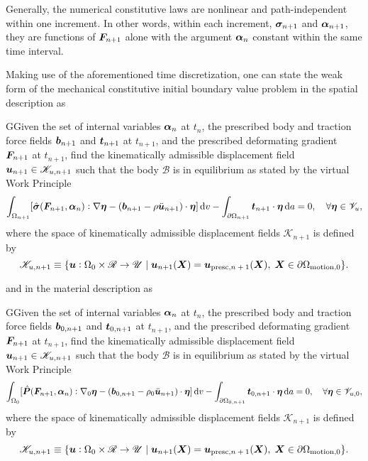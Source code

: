 Generally, the numerical constitutive laws are nonlinear and path-independent within one increment.
In other words, within each increment, $\bm{\sigma}_{n+1}$ and $\bm{\alpha}_{n+1}$, they are functions of $\bm{F}_{n+1}$ alone with the argument $\bm{\alpha}_n$ constant within the same time interval.

Making use of the aforementioned time discretization, one can state the weak form of the mechanical constitutive initial boundary value problem in the spatial description as
\begin{problem}
    GGiven the set of internal variables $\bm{\alpha}_n$ at $t_n$, the prescribed body and traction force fields $\bm{b}_{n+1}$ and $\bm{t}_{n+1}$ at $t_{n+1}$, and the prescribed deformating gradient $\bm{F}_{n+1}$ at $t_{n+1}$, find the kinematically admissible displacement field $\bm{u}_{n+1}\in\mathscr{K}_{u,n+1}$ such that the body $\mathscr{B}$ is in equilibrium as stated by the virtual Work Principle
            \begin{equation}
        \int_{\Omega_{n+1}} [\hat{\bm{\sigma}}(\bm{F}_{n+1}, \bm{\alpha}_n):\nabla \bm{\eta} - (\bm{b}_{n+1}-\rho\ddot{\bm u}_{n+1})\cdot \bm{\eta}]\,\mathrm{d} v - \int_{\partial\Omega_{n+1}} \bm{t}_{n+1}\cdot \bm{\eta}\,\mathrm{d} a = 0,\quad \forall \bm{\eta} \in \mathscr{V}_u,
    \end{equation}
    where the space of kinematically admissible displacement fields $\mathscr{K}_{n+1}$ is defined by
    \begin{equation}
            \mathscr{K}_{u,n+1}\equiv \{\bm{u}:\Omega_0\times \mathscr{R}\to \mathscr{U}\;|\;\bm{u}_{n+1}(\bm{X}) = \bm{u}_\text{presc,$n+1$}(\bm{X}),\;\bm{X}\in\partial \Omega_\text{motion,0}\}.
    \end{equation}
\end{problem}
and in the material description as
\begin{problem}
    GGiven the set of internal variables $\bm{\alpha}_n$ at $t_n$, the prescribed body and traction force fields $\bm{b}_{0,n+1}$ and $\bm{t}_{0,n+1}$ at $t_{n+1}$, and the prescribed deformating gradient $\bm{F}_{n+1}$ at $t_{n+1}$, find the kinematically admissible displacement field $\bm{u}_{n+1}\in\mathscr{K}_{u,n+1}$ such that the body $\mathscr{B}$ is in equilibrium as stated by the virtual Work Principle
            \begin{equation}
        \int_{\Omega_0} [\hat{\bm{P}}(\bm{F}_{n+1}, \bm{\alpha}_n):\nabla_0 \bm{\eta} - (\bm{b}_{0,n+1}-\rho_0\ddot{\bm u}_{n+1})\cdot \bm{\eta}]\,\mathrm{d} v - \int_{\partial\Omega_{0,n+1}} \bm{t}_{0,n+1}\cdot \bm{\eta}\,\mathrm{d} a = 0,\quad \forall \bm{\eta} \in \mathscr{V}_{u,0},
    \end{equation}
    where the space of kinematically admissible displacement fields $\mathscr{K}_{n+1}$ is defined by
    \begin{equation}
            \mathscr{K}_{u,n+1}\equiv \{\bm{u}:\Omega_0\times \mathscr{R}\to \mathscr{U}\;|\;\bm{u}_{n+1}(\bm{X}) = \bm{u}_\text{presc,$n+1$}(\bm{X}),\;\bm{X}\in\partial \Omega_\text{motion,0}\}.
    \end{equation}
\end{problem}

